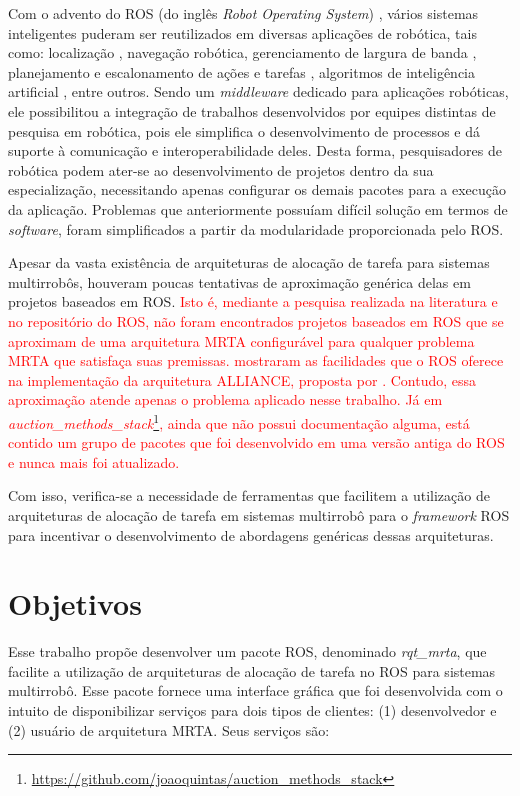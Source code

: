         Com o advento do ROS (do inglês \textit{Robot Operating System}) \cite{ref:quigley2009ros}, vários sistemas inteligentes puderam ser reutilizados em diversas aplicações de robótica, tais como: localização \cite{ref:li2017kld-samcl}, navegação robótica, gerenciamento de largura de banda \cite{ref:julio2015dynamic}, planejamento e escalonamento de ações e tarefas \cite{ref:fox2003pddl2, ref:manne1960job}, algoritmos de inteligência artificial \cite{ref:adrianohrl2015fuzzy, ref:watkins1992qlearning}, entre outros. Sendo um \textit{middleware} dedicado para aplicações robóticas, ele possibilitou a integração de trabalhos desenvolvidos por equipes distintas de pesquisa em robótica, pois ele simplifica o desenvolvimento de processos e dá suporte à comunicação e interoperabilidade deles. Desta forma, pesquisadores de robótica podem ater-se ao desenvolvimento de projetos dentro da sua especialização, necessitando apenas configurar os demais pacotes para a execução da aplicação. Problemas que anteriormente possuíam difícil solução em termos de \textit{software}, foram simplificados a partir da modularidade proporcionada pelo ROS.
        
        Apesar da vasta existência de arquiteturas de alocação de tarefa para sistemas multirrobôs, houveram poucas tentativas de aproximação genérica delas em projetos baseados em ROS. \textcolor{red}{Isto é, mediante a pesquisa realizada na literatura e no repositório do ROS, não foram encontrados projetos baseados em ROS que se aproximam de uma arquitetura MRTA configurável para qualquer problema MRTA que satisfaça suas premissas.  mostraram as facilidades que o ROS oferece na implementação da arquitetura ALLIANCE, proposta por . Contudo, essa aproximação atende apenas o problema aplicado nesse trabalho. Já em \textit{ auction\_methods\_stack}\footnote{\url{https://github.com/joaoquintas/auction_methods_stack}}, ainda que não possui documentação alguma, está contido um grupo de pacotes que foi desenvolvido em uma versão antiga do ROS e nunca mais foi atualizado.}
        
        Com isso, verifica-se a necessidade de ferramentas que facilitem a utilização de arquiteturas de alocação de tarefa em sistemas multirrobô para o \textit{framework} ROS para incentivar o desenvolvimento de abordagens genéricas dessas arquiteturas.
    
    \section{Objetivos} \label{sec:objetivos}
        Esse trabalho propõe desenvolver um pacote ROS, denominado \textit{rqt\_mrta}, que facilite a utilização de arquiteturas de alocação de tarefa no ROS para sistemas multirrobô. Esse pacote fornece uma interface gráfica que foi desenvolvida com o intuito de disponibilizar serviços para dois tipos de clientes: (1) desenvolvedor e (2) usuário de arquitetura MRTA. Seus serviços são:
        
